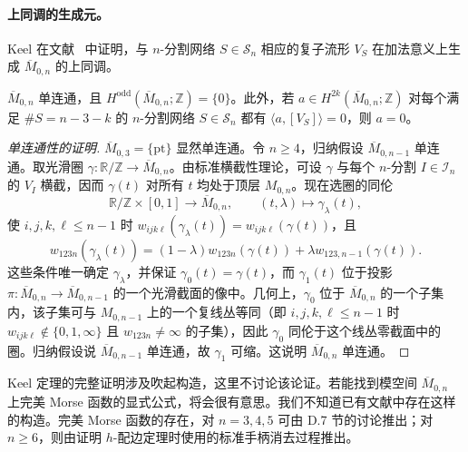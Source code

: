 \paragraph{上同调的生成元。}
Keel 在文献~ 中证明，与 $n$-分割网络 $S\in\mathcal S_n$ 相应的复子流形 $V_S$ 在加法意义上生成 $\overline M_{0,n}$ 的上同调。

\begin{theorem}[Keel]\label{thm:D-6-4}
$\overline M_{0,n}$ 单连通，且 $H^{\mathrm{odd}}(\overline M_{0,n};\mathbb Z)=\{0\}$。此外，若 $a\in H^{2k}(\overline M_{0,n};\mathbb Z)$ 对每个满足 $\#S=n-3-k$ 的 $n$-分割网络 $S\in\mathcal S_n$ 都有 $\langle a,[V_S]\rangle=0$，则 $a=0$。
\end{theorem}

\begin{proof}[单连通性的证明]
$\overline M_{0,3}=\{\mathrm{pt}\}$ 显然单连通。令 $n\ge4$，归纳假设 $\overline M_{0,n-1}$ 单连通。取光滑圈 $\gamma:\mathbb R/\mathbb Z\to\overline M_{0,n}$。由标准横截性理论，可设 $\gamma$ 与每个 $n$-分割 $I\in\mathcal I_n$ 的 $V_I$ 横截，因而 $\gamma(t)$ 对所有 $t$ 均处于顶层 $M_{0,n}$。现在选圈的同伦
\[
  \mathbb R/\mathbb Z\times[0,1]\longrightarrow\overline M_{0,n},
  \qquad(t,\lambda)\longmapsto\gamma_\lambda(t),
\]
使 $i,j,k,\ell\le n-1$ 时 $w_{ijk\ell}(\gamma_\lambda(t))=w_{ijk\ell}(\gamma(t))$，且
\[
  w_{123n}(\gamma_\lambda(t))
  =(1-\lambda)w_{123n}(\gamma(t))
    +\lambda w_{123,n-1}(\gamma(t)).
\]
这些条件唯一确定 $\gamma_\lambda$，并保证 $\gamma_0(t)=\gamma(t)$，而 $\gamma_1(t)$ 位于投影 $\pi:\overline M_{0,n}\to\overline M_{0,n-1}$ 的一个光滑截面的像中。几何上，$\gamma_0$ 位于 $\overline M_{0,n}$ 的一个子集内，该子集可与 $M_{0,n-1}$ 上的一个复线丛等同（即 $i,j,k,\ell\le n-1$ 时 $w_{ijk\ell}\notin\{0,1,\infty\}$ 且 $w_{123n}\ne\infty$ 的子集），因此 $\gamma_0$ 同伦于这个线丛零截面中的圈。归纳假设说 $\overline M_{0,n-1}$ 单连通，故 $\gamma_1$ 可缩。这说明 $\overline M_{0,n}$ 单连通。
\end{proof}

Keel 定理的完整证明涉及吹起构造，这里不讨论该论证。若能找到模空间 $\overline M_{0,n}$ 上完美 Morse 函数的显式公式，将会很有意思。我们不知道已有文献中存在这样的构造。完美 Morse 函数的存在，对 $n=3,4,5$ 可由 D.7 节的讨论推出；对 $n\ge6$，则由证明 $h$-配边定理时使用的标准手柄消去过程推出。

